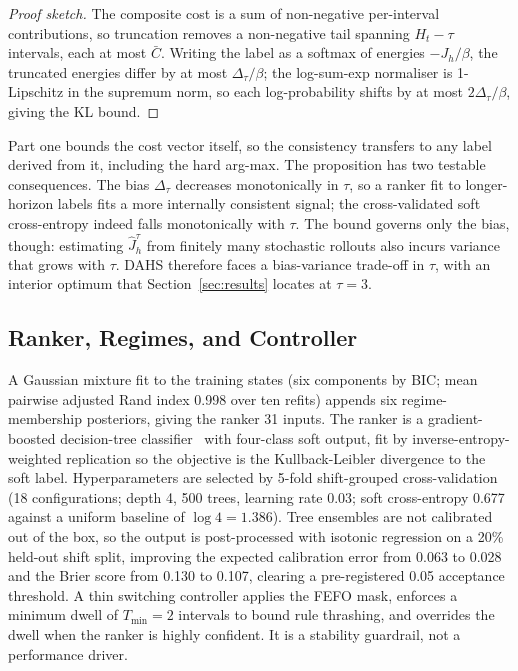 \documentclass[conference]{IEEEtran}
\begin{document}
\begin{proof}[Proof sketch]
The composite cost is a sum of non-negative per-interval contributions, so
truncation removes a non-negative tail spanning $H_t-\tau$ intervals, each at most
$\bar{C}$. Writing the label as a softmax of energies $-J_h/\beta$, the truncated
energies differ by at most $\Delta_\tau/\beta$; the log-sum-exp normaliser is
1-Lipschitz in the supremum norm, so each log-probability shifts by at most
$2\Delta_\tau/\beta$, giving the KL bound.
\end{proof}

Part one bounds the cost vector itself, so the consistency transfers to any label
derived from it, including the hard arg-max. The proposition has two testable
consequences. The bias $\Delta_\tau$ decreases monotonically in $\tau$, so a ranker
fit to longer-horizon labels fits a more internally consistent signal; the
cross-validated soft cross-entropy indeed falls monotonically with $\tau$. The
bound governs only the bias, though: estimating $\hat{J}^{\tau}_h$ from finitely
many stochastic rollouts also incurs variance that grows with $\tau$. DAHS
therefore faces a bias-variance trade-off in $\tau$, with an interior optimum that
Section~\ref{sec:results} locates at $\tau = 3$.

\subsection{Ranker, Regimes, and Controller}
\label{sec:ranker}

A Gaussian mixture fit to the training states (six components by BIC; mean pairwise
adjusted Rand index 0.998 over ten refits) appends six regime-membership
posteriors, giving the ranker 31 inputs. The ranker is a gradient-boosted
decision-tree classifier~\cite{chen2016xgboost} with four-class soft output, fit by
inverse-entropy-weighted replication so the objective is the Kullback-Leibler
divergence to the soft label. Hyperparameters are selected by 5-fold
shift-grouped cross-validation (18 configurations; depth 4, 500 trees, learning
rate 0.03; soft cross-entropy 0.677 against a uniform baseline of $\log 4 =
1.386$). Tree ensembles are not calibrated out of the box, so the output is
post-processed with isotonic regression on a 20\% held-out shift split, improving
the expected calibration error from 0.063 to 0.028 and the Brier score from 0.130
to 0.107, clearing a pre-registered 0.05 acceptance threshold. A thin switching
controller
applies the FEFO mask, enforces a minimum dwell of $T_{\min}{=}2$ intervals to
bound rule thrashing, and overrides the dwell when the ranker is highly confident.
It is a stability guardrail, not a performance driver.
\end{document}
